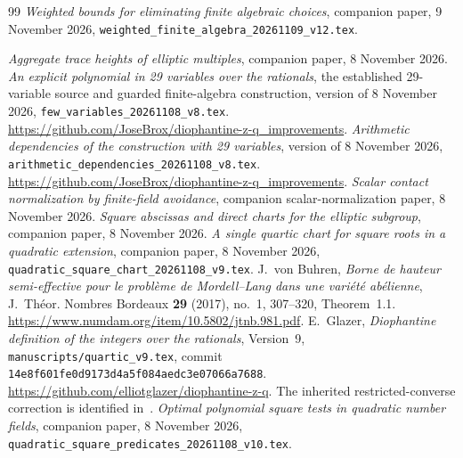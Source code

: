 \documentclass[11pt,a4paper]{article}
\begin{document}
\begin{thebibliography}{99}
\emph{Weighted bounds for eliminating finite algebraic choices},
companion paper, 9 November 2026,
\nolinkurl{weighted_finite_algebra_20261109_v12.tex}.

\emph{Aggregate trace heights of elliptic multiples},
companion paper, 8 November 2026.
\emph{An explicit polynomial in 29 variables over the rationals},
the established 29-variable source and guarded finite-algebra
construction, version of 8 November 2026,
\nolinkurl{few_variables_20261108_v8.tex}.
\url{https://github.com/JoseBrox/diophantine-z-q_improvements}.
\emph{Arithmetic dependencies of the construction with 29 variables},
version of 8 November 2026,
\nolinkurl{arithmetic_dependencies_20261108_v8.tex}.
\url{https://github.com/JoseBrox/diophantine-z-q_improvements}.
\emph{Scalar contact normalization by finite-field avoidance},
companion scalar-normalization paper, 8 November 2026.
\emph{Square abscissas and direct charts for the elliptic subgroup},
companion paper, 8 November 2026.
\emph{A single quartic chart for square roots in a quadratic extension},
companion paper, 8 November 2026,
\nolinkurl{quadratic_square_chart_20261108_v9.tex}.
J.~von Buhren,
\emph{Borne de hauteur semi-effective pour le probl\`eme de
Mordell--Lang dans une vari\'et\'e ab\'elienne},
J.~Th\'eor. Nombres Bordeaux \textbf{29} (2017), no.~1,
307--320, Theorem~1.1.
\url{https://www.numdam.org/item/10.5802/jtnb.981.pdf}.
E.~Glazer, \emph{Diophantine definition of the integers over the
rationals}, Version~9, \nolinkurl{manuscripts/quartic_v9.tex},
commit \nolinkurl{14e8f601fe0d9173d4a5f084aedc3e07066a7688}.
\url{https://github.com/elliotglazer/diophantine-z-q}.
The inherited restricted-converse correction is identified
in~\cite{Dependencies}.
\emph{Optimal polynomial square tests in quadratic number fields},
companion paper, 8 November 2026,
\nolinkurl{quadratic_square_predicates_20261108_v10.tex}.
\end{thebibliography}
\end{document}
